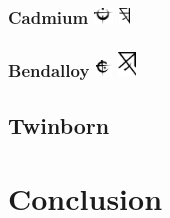 \documentclass[conference]{IEEEtran}
\begin{document}
    \subsubsection{\textbf{Cadmium}    \includegraphics[height=1em]{images/Cadmium.png}	\includegraphics[height=1em]{images/Cadmium_(Feruchemy).png}}	\label{sec:compounder:cadmium}
    \subsubsection{\textbf{Bendalloy}  \includegraphics[height=1em]{images/Bendalloy.png}	\includegraphics[height=1.5em]{images/Bendalloy_(Feruchemy).png}}\label{sec:compounder:bendalloy}
\subsection{\textbf{Twinborn}}

\section{Conclusion}
{}
 
 
\end{document}
